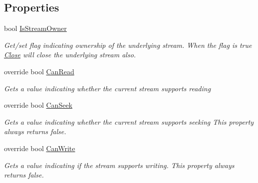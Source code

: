 \subsection*{Properties}
\begin{DoxyCompactItemize}
\item 
bool \hyperlink{class_i_c_sharp_code_1_1_sharp_zip_lib_1_1_tar_1_1_tar_input_stream_ae8fdf574aaaf64100a02f6d6e77be306}{Is\+Stream\+Owner}
\begin{DoxyCompactList}\small\item\em Get/set flag indicating ownership of the underlying stream. When the flag is true \hyperlink{class_i_c_sharp_code_1_1_sharp_zip_lib_1_1_tar_1_1_tar_input_stream_a0e00dc015294bb80b69c144622a861e5}{Close} will close the underlying stream also. \end{DoxyCompactList}\item 
override bool \hyperlink{class_i_c_sharp_code_1_1_sharp_zip_lib_1_1_tar_1_1_tar_input_stream_a5e0cbc0fa89fb4d18ef09c88868f00b6}{Can\+Read}
\begin{DoxyCompactList}\small\item\em Gets a value indicating whether the current stream supports reading \end{DoxyCompactList}\item 
override bool \hyperlink{class_i_c_sharp_code_1_1_sharp_zip_lib_1_1_tar_1_1_tar_input_stream_ae4fea5c93ad8563af534c00e2af87d0b}{Can\+Seek}
\begin{DoxyCompactList}\small\item\em Gets a value indicating whether the current stream supports seeking This property always returns false. \end{DoxyCompactList}\item 
override bool \hyperlink{class_i_c_sharp_code_1_1_sharp_zip_lib_1_1_tar_1_1_tar_input_stream_adce4dcdd21216906b8e8ad1b29683583}{Can\+Write}
\begin{DoxyCompactList}\small\item\em Gets a value indicating if the stream supports writing. This property always returns false. \end{DoxyCompactList}\item 

\end{DoxyCompactItemize}
